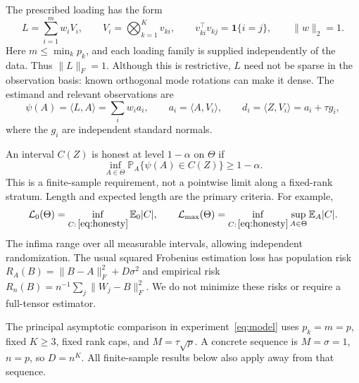\documentclass[11pt]{article}
\theoremstyle{remark}
\newcommand{\E}{\mathbb E}
\newcommand{\PP}{\mathbb P}
\newcommand{\ip}[2]{\langle #1,#2\rangle}
\newcommand{\norm}[1]{\lVert #1\rVert}
\newcommand{\calL}{\mathcal L}
\begin{document}
The prescribed loading has the form
\begin{equation}\label{eq:loading}
 L=\sum_{i=1}^m w_i V_i,\qquad
 V_i=\bigotimes_{k=1}^K v_{ki},\qquad
 v_{ki}^\top v_{kj}=\mathbf1\{i=j\},\qquad \norm w_2=1.
\end{equation}
Here $m\le\min_k p_k$, and each loading family is supplied independently of the data. Thus $\norm L_F=1$. Although this is restrictive, $L$ need not be sparse in the observation basis: known orthogonal mode rotations can make it dense. The estimand and relevant observations are
\begin{equation}\label{eq:diagonal}
 \psi(A)=\ip LA=\sum_iw_i a_i,\qquad
 a_i=\ip A{V_i},\qquad d_i=\ip Z{V_i}=a_i+\tau g_i,
\end{equation}
where the $g_i$ are independent standard normals.

An interval $C(Z)$ is honest at level $1-\alpha$ on $\Theta$ if
\begin{equation}\label{eq:honesty}
 \inf_{A\in\Theta}\PP_A\{\psi(A)\in C(Z)\}\ge1-\alpha.
\end{equation}
This is a finite-sample requirement, not a pointwise limit along a fixed-rank stratum. Length and expected length are the primary criteria. For example,
\begin{equation}\label{eq:minimaxcriteria}
 \calL_0(\Theta)=\inf_{C:\,\eqref{eq:honesty}}\E_0|C|,
 \qquad \calL_{\max}(\Theta)=\inf_{C:\,\eqref{eq:honesty}}\sup_{A\in\Theta}\E_A|C|.
\end{equation}
The infima range over all measurable intervals, allowing independent randomization. The usual squared Frobenius estimation loss has population risk $R_A(B)=\norm{B-A}_F^2+D\sigma^2$ and empirical risk $R_n(B)=n^{-1}\sum_j\norm{W_j-B}_F^2$. We do not minimize these risks or require a full-tensor estimator.

The principal asymptotic comparison in experiment~\eqref{eq:model} uses $p_k=m=p$, fixed $K\ge3$, fixed rank caps, and $M=\tau\sqrt p$. A concrete sequence is $M=\sigma=1$, $n=p$, so $D=n^K$. All finite-sample results below also apply away from that sequence.
\end{document}
